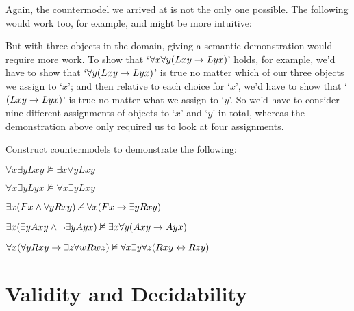 Again, the countermodel we arrived at is not the only one possible.  The following would work too, for example, and might be more intuitive:
\begin{center}
\end{center}
But with three objects in the domain, giving a semantic demonstration would require more work.  To show that `$\forall x\forall y(Lxy \rightarrow Lyx)$' holds, for example, we'd have to show that `$\forall y(Lxy \rightarrow Lyx)$' is true no matter which of our three objects we assign to `$x$'; and then relative to each choice for `$x$', we'd have to show that `$(Lxy \rightarrow Lyx)$' is true no matter what we assign to `$y$'.  So we'd have to consider nine different assignments of objects to `$x$' and `$y$' in total, whereas the demonstration above only required us to look at four assignments.

\practiceproblems
\problempart Construct countermodels to demonstrate the following:

\begin{earg}

\item $\forall x \exists y Lxy \nvDash \exists x \forall y Lxy$ %
\item $\forall x \exists yLyx \nvDash \forall x \exists yLxy$
\item $\exists x(Fx \wedge \forall y Rxy) \nvDash \forall x(Fx \rightarrow \exists yRxy)$ %
\item $\exists x(\exists yAxy \wedge \neg \exists y Ayx) \nvDash \exists x \forall y(Axy \rightarrow Ayx)$
\item $\forall x(\forall yRxy \rightarrow \exists z \forall wRwz) \nvDash \forall x \exists y \forall z(Rxy \leftrightarrow Rzy)$
\end{earg}


\section{Validity and Decidability}

